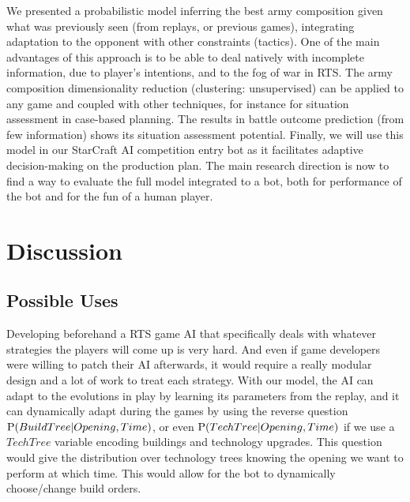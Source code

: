 We presented a probabilistic model inferring the best army composition given what was previously seen (from replays, or previous games), integrating adaptation to the opponent with other constraints (tactics). One of the main advantages of this approach is to be able to deal natively with incomplete information, due to player's intentions, and to the fog of war in RTS. The army composition dimensionality reduction (clustering: unsupervised) can be applied to any game and coupled with other techniques, for instance for situation assessment in case-based planning. The results in battle outcome prediction (from few information) shows its situation assessment potential. Finally, we will use this model in our StarCraft AI competition entry bot as it facilitates adaptive decision-making on the production plan. The main research direction is now to find a way to evaluate the full model integrated to a bot, both for performance of the bot and for the fun of a human player.





\clearpage
\section{Discussion}

\subsection{Possible Uses}
Developing beforehand a RTS game AI that specifically deals with whatever strategies the players will come up is very hard. And even if game developers were willing to patch their AI afterwards, it would require a really modular design and a lot of work to treat each strategy. With our model, the AI can adapt to the evolutions in play by learning its parameters from the replay, and it can dynamically adapt during the games by using the reverse question $\mathrm{P}(BuildTree | Opening,Time)$, or even $\mathrm{P}(TechTree | Opening, Time)$ if we use a $TechTree$ variable encoding buildings and technology upgrades. This question would give the distribution over technology trees knowing the opening we want to perform at which time. This would allow for the bot to dynamically choose/change build orders.

